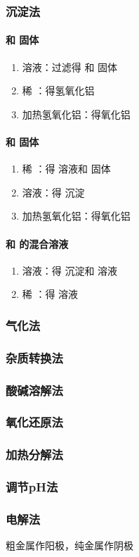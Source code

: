 \documentclass[10pt]{article}
\begin{document}
	
	\subsubsection{沉淀法}
	\paragraph{ 和 固体}
	\begin{enumerate}
		\item {}溶液：过滤得 和 固体
		\item 稀 ：得氢氧化铝
		\item 加热氢氧化铝：得氧化铝
	\end{enumerate}
	\paragraph{ 和 固体}
	\begin{enumerate}
		\item 稀 ：得 溶液和 固体
		\item {}溶液：得 沉淀
		\item 加热氢氧化铝：得氧化铝
	\end{enumerate}
	\paragraph{ 和 的混合溶液}
	\begin{enumerate}
		\item {}溶液：得 沉淀和 溶液
		\item 稀 ：得 溶液
	\end{enumerate}
	
	\subsubsection{气化法}
	
	\subsubsection{杂质转换法}
	
	\subsubsection{酸碱溶解法}
	
	\subsubsection{氧化还原法}
	
	\subsubsection{加热分解法}
		
	\subsubsection{调节pH法}
	
	\subsubsection{电解法}
	
	粗金属作阳极，纯金属作阴极
	
\end{document}
